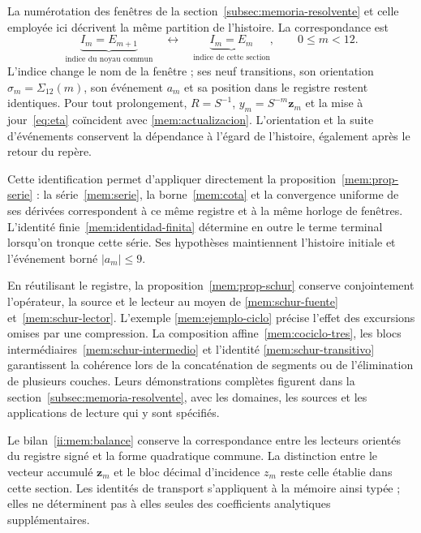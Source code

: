La numérotation des fenêtres de la section~\ref{subsec:memoria-resolvente}
et celle employée ici décrivent la même partition de l’histoire. La
correspondance est
\[
 \underbrace{I_m=E_{m+1}}_{\text{indice du noyau commun}}
 \quad\longleftrightarrow\quad
 \underbrace{I_m=E_m}_{\text{indice de cette section}},
 \qquad 0\leq m<12.
\]
L’indice change le nom de la fenêtre ; ses neuf transitions,
son orientation \(\sigma_m=\Sigma_{12}(m)\), son événement \(a_m\) et
sa position dans le registre restent identiques. Pour tout prolongement,
\(R=S^{-1}\), \(y_m=S^{-m}\mathbf z_m\) et la
mise à jour~\eqref{eq:eta} coïncident avec
\eqref{mem:actualizacion}. L’orientation et la suite d’événements
conservent la dépendance à l’égard de l’histoire, également après le
retour du repère.

Cette identification permet d’appliquer directement la
proposition~\ref{mem:prop-serie} : la série~\eqref{mem:serie}, la
borne~\eqref{mem:cota} et la convergence uniforme de ses dérivées
correspondent à ce même registre et à la même horloge de fenêtres. L’identité
finie~\eqref{mem:identidad-finita} détermine en outre le terme
terminal lorsqu’on tronque cette série. Ses hypothèses maintiennent l’histoire initiale
et l’événement borné \(|a_m|\leq9\).

En réutilisant le registre, la proposition~\ref{mem:prop-schur} conserve
conjointement l’opérateur, la source et le lecteur au moyen de
\eqref{mem:schur-fuente} et~\eqref{mem:schur-lector}. L’exemple
\eqref{mem:ejemplo-ciclo} précise l’effet des excursions omises
par une compression. La composition affine~\eqref{mem:cociclo-tres}, les
blocs intermédiaires~\eqref{mem:schur-intermedio} et l’identité
\eqref{mem:schur-transitivo} garantissent la cohérence lors de la concaténation de
segments ou de l’élimination de plusieurs couches. Leurs démonstrations complètes figurent
dans la section~\ref{subsec:memoria-resolvente}, avec les domaines, les
sources et les applications de lecture qui y sont spécifiés.

Le bilan~\eqref{ii:mem:balance} conserve la correspondance entre les
lecteurs orientés du registre signé et la forme quadratique commune.
La distinction entre le vecteur accumulé \(\mathbf z_m\) et le bloc
décimal d’incidence \(z_m\) reste celle établie dans cette section.
Les identités de transport s’appliquent à la mémoire ainsi typée ; elles ne
déterminent pas à elles seules des coefficients analytiques supplémentaires.
